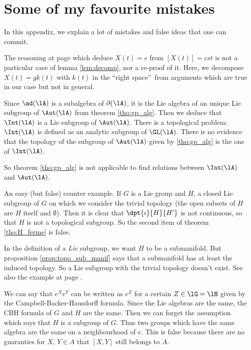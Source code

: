 \section{Some of my favourite mistakes}

In this appendix, we explain a lot of mistakes and false ideas that one can commit.

\begin{erreur}\label{err:decomp}
The reasoning at page \pageref{pg:X_t} which deduce $X(t)=e$ from $[X(t)]=cst$ is not a particular case of lemma \ref{lem:decomp}, nor a re-proof of it. Here, we decompose $X(t)=gk(t)$ with $k(t)$ in the ``right space''\ from arguments which are true in our case but not in general.
\end{erreur}

\begin{erreur}\label{err:Intt_Aut}
Since $\ad(\lA)$ is a subalgebra of $\partial(\lA)$, it is the Lie algebra of an unique Lie subgroup of $\Aut(\lA)$ from theorem \ref{tho:gp_alg}. Then we deduce that $\Int(\lA)$ is a Lie subgroup of $\Aut(\lA)$. There is a topological problem: $\Int(\lA)$ is defined as an analytic subgroup of $\GL(\lA)$. There is no evidence that the topology of the subgroup of $\Aut(\lA)$ given by \ref{tho:gp_alg} is the one of $\Int(\lA)$.

So theorem \ref{tho:gp_alg} is not applicable to find relations between $\Int(\lA)$ and $\Aut(\lA)$.
\end{erreur}

\begin{erreur}\label{err:gross}
An easy (but false) counter example. If $G$ is a Lie group and $H$, a closed Lie subgroup of $G$ on which we consider the trivial topology (the open subsets of $H$ are $H$ itself and $\emptyset$). Then it is clear that $\dpt{\iota}{H}{H'}$ is not continuous, so that $H$ is not a topological subgroup. So the second item of theorem \ref{tho:H_ferme} is false.

In the definition of a \emph{Lie} subgroup, we want $H$ to be a submanifold. But proposition \ref{prop:topo_sub_manif} says that a submanifold has at least the induced topology. So a Lie subgroup with the trivial topology doesn't exist. See also the example at page \pageref{pg:ex_topo_Lie}.
\end{erreur}

\begin{erreur}\label{err:gp_meme_alg}
We can say that $e^Xe^Y$ can be written as $e^Z$ for a certain $Z\in\lG=\lH$ given by the Campbell-Backer-Hausdorff formula. Since the Lie algebras are the same, the CBH formula of $G$ and $H$ are the same. Then we can forget the assumption which says that $H$ is a subgroup of $G$. Thus two groups which have the same algebra are the same on a neighbourhood of $e$. This is false because there are no guaranties for $X$, $Y\in A$ that $[X,Y]$ still belongs to $A$.
\end{erreur}

